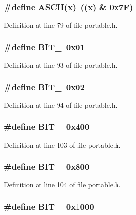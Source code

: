 \subsubsection{\setlength{\rightskip}{0pt plus 5cm}\#define ASCII(x)\ ((x) \& 0x7F)}\label{portable_8h_a7}




Definition at line 79 of file portable.h.
\subsubsection{\setlength{\rightskip}{0pt plus 5cm}\#define BIT\_\ 0x01}\label{portable_8h_a12}




Definition at line 93 of file portable.h.
\subsubsection{\setlength{\rightskip}{0pt plus 5cm}\#define BIT\_\ 0x02}\label{portable_8h_a13}




Definition at line 94 of file portable.h.
\subsubsection{\setlength{\rightskip}{0pt plus 5cm}\#define BIT\_\ 0x400}\label{portable_8h_a22}




Definition at line 103 of file portable.h.
\subsubsection{\setlength{\rightskip}{0pt plus 5cm}\#define BIT\_\ 0x800}\label{portable_8h_a23}




Definition at line 104 of file portable.h.
\subsubsection{\setlength{\rightskip}{0pt plus 5cm}\#define BIT\_\ 0x1000}\label{portable_8h_a24}




